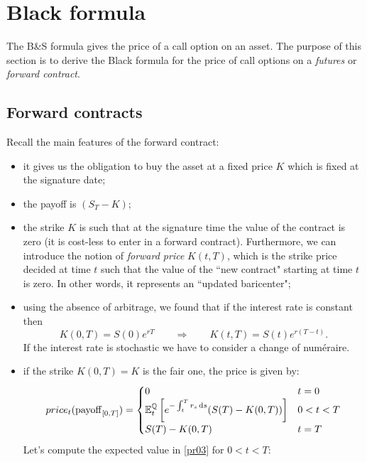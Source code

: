 \section{Black formula}
The B\&S formula gives the price of a call option on an asset. The purpose of this section is to derive the Black formula for the price of call options on a \emph{futures} or \emph{forward contract}.\\

\subsection{Forward contracts} %
Recall the main features of the forward contract:
\begin{itemize}
    \item it gives us the obligation to buy the asset at a fixed price $K$ which is fixed at the signature date;
    \item the payoff is $(S_T-K)$;
    \item the strike $K$ is such that at the signature time the value of the contract is zero (it is cost-less to enter in a forward contract). Furthermore, we can introduce the notion of \emph{forward price} $K(t,T)$, which is the strike price decided at time $t$ such that the value of the ``new contract" starting at time $t$ is zero. In other words, it represents an ``updated baricenter";
    \item using the absence of arbitrage, we found that if the interest rate is constant then
    \begin{equation}
        K(0,T) = S(0)e^{rT} \qquad\Rightarrow\qquad K(t,T) = S(t)e^{r(T-t)}.
    \end{equation}
    If the interest rate is stochastic we have to consider a change of numéraire.
    \item if the strike $K(0,T)=K$ is the fair one, the price is given by:
    \begin{equation}\label{pr03}
        price_t(\operatorname{payoff}_{[0,T]}) =
        \begin{cases}
        0 & t=0 \\
        \mathbb{E}^{\mathbb{Q}}_t\left[e^{-\int_t^T r_s\,\dd s}(S(T)-K(0,T))\right] & 0<t<T \\
        S(T)-K(0,T) & t=T
        \end{cases}
    \end{equation}
    Let's compute the expected value in \eqref{pr03} for $0<t<T$:
    \begin{align*}

\end{align*}
\end{itemize}
